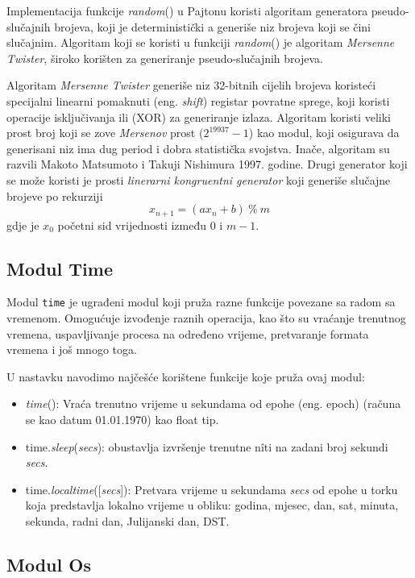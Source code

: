 Implementacija funkcije \textit{random}() u Pajtonu koristi algoritam generatora pseudo-slučajnih brojeva, koji je deterministički a generiše niz brojeva koji se čini slučajnim. Algoritam koji se koristi u funkciji \textit{random}() je algoritam \textit{Mersenne Twister},  široko korišten   za generiranje pseudo-slučajnih brojeva.

Algoritam \textit{Mersenne Twister} generiše niz 32-bitnih cijelih brojeva koristeći specijalni linearni pomaknuti (eng. \textit{shift})  registar povratne sprege,  koji koristi operacije isključivanja ili (XOR) za generiranje izlaza. Algoritam koristi veliki prost broj koji se zove \textit{Mersenov} prost ($2^{19937}-1$) kao modul, koji osigurava da generisani niz ima dug period   i dobra statistička svojstva. Inače, algoritam su razvili Makoto Matsumoto i Takuji Nishimura 1997. godine. Drugi generator  koji se može koristi je prosti \textit{linerarni kongruentni generator} 
koji generiše  slučajne brojeve po rekurziji
$$ x_{n+1} = (a x_n + b)\ \%\ m $$
gdje je $x_0$ početni sid vrijednosti između 0 i $m-1$. 

\subsection{Modul Time}

Modul  \texttt{time} je ugrađeni modul koji pruža razne funkcije povezane sa radom sa vremenom. Omogućuje   izvođenje raznih operacija, kao što su vraćanje trenutnog vremena, uspavljivanje procesa na određeno vrijeme,  pretvaranje formata vremena i još mnogo toga.

U nastavku navodimo najčešće korištene funkcije koje pruža ovaj modul:
\begin{itemize}
	\item  \textit{time}(): Vraća trenutno vrijeme u sekundama od epohe (eng. epoch) (računa se kao datum 01.01.1970) kao float tip. 
	\item time.\textit{sleep}(\textit{secs}): obustavlja izvršenje trenutne n\^iti na zadani broj sekundi \textit{secs}. 
	\item time.\textit{localtime}([\textit{secs}]): Pretvara vrijeme u sekundama \textit{secs} od epohe u torku koja predstavlja lokalno vrijeme u obliku:  godina, mjesec, dan, sat, minuta, sekunda, radni dan, Julijanski dan, DST.
\end{itemize}


\subsection{Modul Os}

